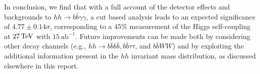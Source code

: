 In conclusion, we find that with a full account of the detector effects and backgrounds to $hh\rightarrow b\bar{b}\gamma\gamma$, a cut based analysis leads to an expected significance of $4.77 \pm 0.14 \sigma$, corresponding to a $45 \%$ measurement of the Higgs self-coupling at $27\, {\rm \text{TeV}}$ with $15~\text{ab}^{-1}$. Future improvements can be made both by considering other decay channels (e.g., $hh\rightarrow b\bar{b}b\bar{b}, b\bar{b}\tau\tau$, and $b\bar{b}WW$) and by exploiting the additional information present in the $hh$ invariant mass distribution, as discussed elsewhere in this report.

